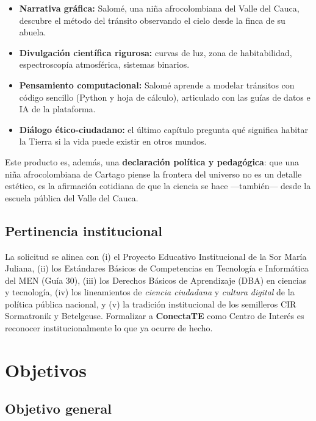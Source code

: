 \documentclass[12pt, letterpaper]{article}
\newcommand{\conectate}{\textbf{ConectaTE}}
\begin{document}
\begin{itemize}[leftmargin=*]
  \item \textbf{Narrativa gráfica:} Salomé, una niña afrocolombiana del Valle del Cauca, descubre el método del tránsito observando el cielo desde la finca de su abuela.
  \item \textbf{Divulgación científica rigurosa:} curvas de luz, zona de habitabilidad, espectroscopía atmosférica, sistemas binarios.
  \item \textbf{Pensamiento computacional:} Salomé aprende a modelar tránsitos con código sencillo (Python y hoja de cálculo), articulado con las guías de datos e IA de la plataforma.
  \item \textbf{Diálogo ético-ciudadano:} el último capítulo pregunta qué significa habitar la Tierra si la vida puede existir en otros mundos.
\end{itemize}

Este producto es, además, una \textbf{declaración política y pedagógica}: que una niña afrocolombiana de Cartago piense la frontera del universo no es un detalle estético, es la afirmación cotidiana de que la ciencia se hace —también— desde la escuela pública del Valle del Cauca.

\subsection{Pertinencia institucional}

La solicitud se alinea con (i) el Proyecto Educativo Institucional de la Sor María Juliana, (ii) los Estándares Básicos de Competencias en Tecnología e Informática del MEN (Guía 30), (iii) los Derechos Básicos de Aprendizaje (DBA) en ciencias y tecnología, (iv) los lineamientos de \textit{ciencia ciudadana} y \textit{cultura digital} de la política pública nacional, y (v) la tradición institucional de los semilleros CIR Sormatronik y Betelgeuse. Formalizar a \conectate{} como Centro de Interés es reconocer institucionalmente lo que ya ocurre de hecho.

\section{Objetivos}

\subsection{Objetivo general}
\end{document}
